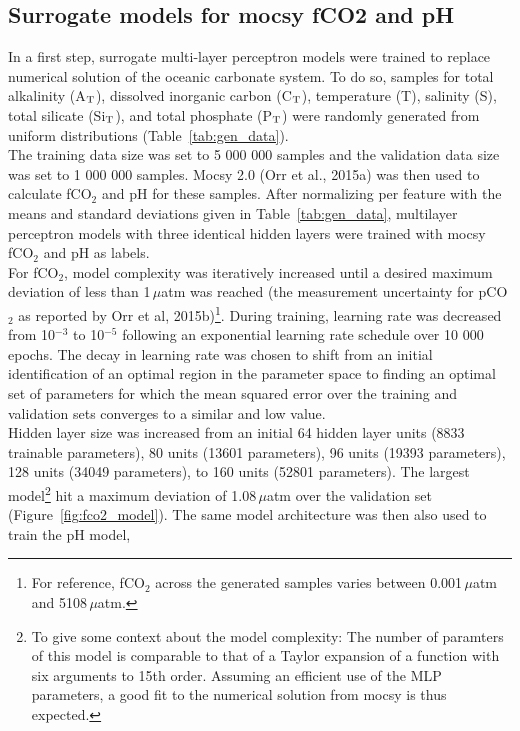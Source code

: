 \documentclass{article}
\begin{document}
	\subsection{Surrogate models for mocsy fCO2 and pH} \label{sect:surrgate_models}
	In a first step, surrogate multi-layer perceptron models were trained to replace numerical solution of the oceanic carbonate system. To do so, samples for total alkalinity (A$_\textup{T}$), dissolved inorganic carbon (C$_\textup{T}$), temperature (T),  salinity (S), total silicate (Si$_\textup{T}$), and total phosphate (P$_\textup{T}$) were randomly generated from uniform distributions (Table~\ref{tab:gen_data}). \\
	The training data size was set to 5 000 000 samples and the validation data size was set to 1 000 000 samples. Mocsy 2.0 (Orr et al., 2015a) was then used to calculate fCO$_2$ and pH for these samples. After normalizing per feature with the means and standard deviations given in Table~\ref{tab:gen_data}, multilayer perceptron models with three identical hidden layers were trained with mocsy fCO$_2$ and pH as labels. \\
	For fCO$_2$, model complexity was iteratively increased until a desired maximum deviation of less than 1\,$\mu$atm was reached (the measurement uncertainty for pCO$_2$ as reported by Orr et al, 2015b)\footnote{For reference, fCO$_2$ across the generated samples varies between 0.001\,$\mu$atm and 5108\,$\mu$atm.}. During training, learning rate was decreased from 10$^{-3}$ to 10$^{-5}$ following an exponential learning rate schedule over 10 000 epochs. The decay in learning rate was chosen to shift from an initial identification of an optimal region in the parameter space to finding an optimal set of parameters for which the mean squared error over the training and validation sets converges to a similar and low value. \\
	Hidden layer size was increased from an initial 64 hidden layer units (8833 trainable parameters), 80 units (13601 parameters), 96 units (19393 parameters), 128 units (34049 parameters), to 160 units (52801 parameters). The largest model\footnote{To give some context about the model complexity: The number of paramters of this model is comparable to that of a Taylor expansion of a function with six arguments to 15th order. Assuming an efficient use of the MLP parameters, a good fit to the numerical solution from mocsy is thus expected.} hit a maximum deviation of 1.08\,$\mu$atm over the validation set (Figure~\ref{fig:fco2_model}).
	The same model architecture was then also used to train the pH model, %
\end{document}
